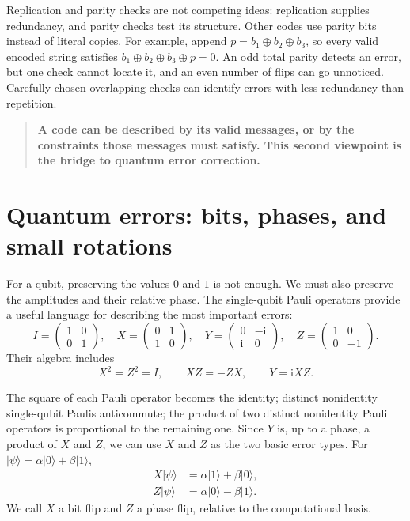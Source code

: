 \documentclass[11pt,a4paper]{article}
\newcommand{\ket}[1]{\lvert #1\rangle}
\newcommand{\ii}{\mathrm{i}}
\newcommand{\takeaway}[1]{\begin{quote}\color{ink}\textbf{#1}\end{quote}}
\begin{document}
Replication and parity checks are not competing ideas: replication supplies redundancy, and parity checks test its structure. Other codes use parity bits instead of literal copies. For example, append $p=b_1\oplus b_2\oplus b_3$, so every valid encoded string satisfies $b_1\oplus b_2\oplus b_3\oplus p=0$. An odd total parity detects an error, but one check cannot locate it, and an even number of flips can go unnoticed. Carefully chosen overlapping checks can identify errors with less redundancy than repetition.

\takeaway{A code can be described by its valid messages, or by the constraints those messages must satisfy. This second viewpoint is the bridge to quantum error correction.}

\newpage
\section{Quantum errors: bits, phases, and small rotations}
For a qubit, preserving the values \(0\) and \(1\) is not enough. We
must also preserve the amplitudes and their relative phase. The
single-qubit Pauli operators provide a useful language for describing
the most important errors:
\begin{equation}
I=\begin{pmatrix}1&0\\0&1\end{pmatrix},\quad
X=\begin{pmatrix}0&1\\1&0\end{pmatrix},\quad
Y=\begin{pmatrix}0&-\ii\\\ii&0\end{pmatrix},\quad
Z=\begin{pmatrix}1&0\\0&-1\end{pmatrix}.
\end{equation}
Their algebra includes
\begin{equation}\label{eq:pauli-algebra}
X^2=Z^2=I,\qquad XZ=-ZX,\qquad Y=\ii XZ.
\end{equation}

The square of each Pauli operator becomes the identity; distinct nonidentity single-qubit Paulis anticommute; the product of two
distinct nonidentity Pauli operators is proportional to the remaining
one. Since \(Y\) is, up to a phase, a product of \(X\) and
\(Z\), we can use \(X\) and \(Z\) as the two basic error types.
For $\ket{\psi}=\alpha\ket0+\beta\ket1$,
\begin{align}
X\ket\psi&=\alpha\ket1+\beta\ket0,\label{eq:x-error}\\
Z\ket\psi&=\alpha\ket0-\beta\ket1.\label{eq:z-error}
\end{align}
We call $X$ a bit flip and $Z$ a phase flip, relative to the computational basis. 
\end{document}
